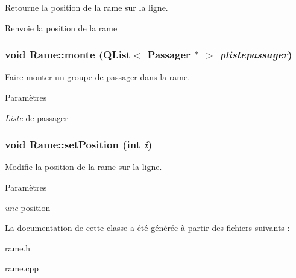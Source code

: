 Retourne la position de la rame sur la ligne. 

\begin{DoxyReturn}{Renvoie}
la position de la rame 
\end{DoxyReturn}
\hypertarget{classRame_a8bc41267a14836e1e95cd59f5ac3def6}{
\subsubsection[{monte}]{\setlength{\rightskip}{0pt plus 5cm}void Rame::monte (QList$<$ {\bf Passager} $\ast$ $>$ {\em plistepassager})}}
\label{classRame_a8bc41267a14836e1e95cd59f5ac3def6}


Faire monter un groupe de passager dans la rame. 


\begin{DoxyParams}{Paramètres}
\item[{\em Liste}]de passager \end{DoxyParams}
\hypertarget{classRame_a2334e438ad1f3e3f93d0580f7f220411}{
\subsubsection[{setPosition}]{\setlength{\rightskip}{0pt plus 5cm}void Rame::setPosition (int {\em i})}}
\label{classRame_a2334e438ad1f3e3f93d0580f7f220411}


Modifie la position de la rame sur la ligne. 


\begin{DoxyParams}{Paramètres}
\item[{\em une}]position \end{DoxyParams}


La documentation de cette classe a été générée à partir des fichiers suivants :\begin{DoxyCompactItemize}
\item 
rame.h\item 
rame.cpp\end{DoxyCompactItemize}
